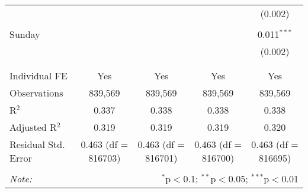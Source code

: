 \documentclass[
]{article}
\begin{document}
\begin{table}[!htbp]
{\begin{tabular}{@{\extracolsep{5pt}}lcccc}
  &  &  &  & (0.002) \\ 
  & & & & \\ 
 Sunday &  &  &  & 0.011$^{***}$ \\ 
  &  &  &  & (0.002) \\ 
  & & & & \\ 
\hline \\[-1.8ex] 
Individual FE & Yes & Yes & Yes & Yes \\ 
Observations & 839,569 & 839,569 & 839,569 & 839,569 \\ 
R$^{2}$ & 0.337 & 0.338 & 0.338 & 0.338 \\ 
Adjusted R$^{2}$ & 0.319 & 0.319 & 0.319 & 0.320 \\ 
Residual Std. Error & 0.463 (df = 816703) & 0.463 (df = 816701) & 0.463 (df = 816700) & 0.463 (df = 816695) \\ 
\hline 
\hline \\[-1.8ex] 
\textit{Note:}  & \multicolumn{4}{r}{$^{*}$p$<$0.1; $^{**}$p$<$0.05; $^{***}$p$<$0.01} \\ 
\end{tabular}
} 
\end{table} 
\newpage
\end{document}
